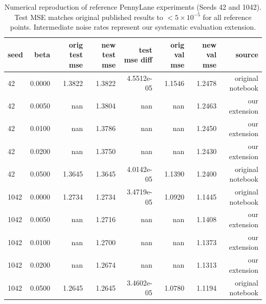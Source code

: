 \begin{table}[htbp]
\centering
\caption{Numerical reproduction of reference PennyLane experiments (Seeds 42 and 1042). Test MSE matches original published results to $<5\times 10^{-5}$ for all reference points. Intermediate noise rates represent our systematic evaluation extension.}
\label{tab:reproduction_pennylane}
\begin{tabular}{lrrrrrrr}
\toprule
\textbf{seed} & \textbf{beta} & \textbf{orig test mse} & \textbf{new test mse} & \textbf{test mse diff} & \textbf{orig val mse} & \textbf{new val mse} & \textbf{source} \\
\midrule
42 & 0.0000 & 1.3822 & 1.3822 & 4.5512e-05 & 1.1546 & 1.2478 & original notebook \\
42 & 0.0050 & nan & 1.3804 & nan & nan & 1.2463 & our extension \\
42 & 0.0100 & nan & 1.3786 & nan & nan & 1.2450 & our extension \\
42 & 0.0200 & nan & 1.3750 & nan & nan & 1.2430 & our extension \\
42 & 0.0500 & 1.3645 & 1.3645 & 4.0142e-05 & 1.1390 & 1.2400 & original notebook \\
1042 & 0.0000 & 1.2734 & 1.2734 & 3.4719e-05 & 1.0920 & 1.1445 & original notebook \\
1042 & 0.0050 & nan & 1.2716 & nan & nan & 1.1408 & our extension \\
1042 & 0.0100 & nan & 1.2700 & nan & nan & 1.1373 & our extension \\
1042 & 0.0200 & nan & 1.2674 & nan & nan & 1.1313 & our extension \\
1042 & 0.0500 & 1.2645 & 1.2645 & 3.4602e-05 & 1.0780 & 1.1194 & original notebook \\
\bottomrule
\end{tabular}
\end{table}